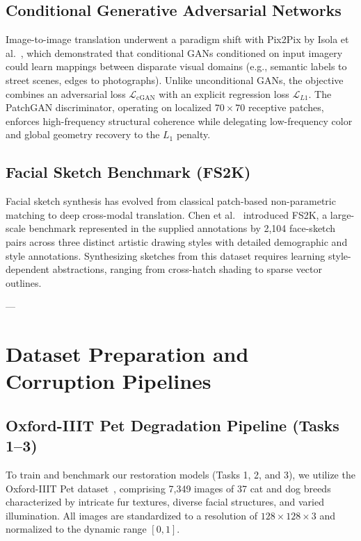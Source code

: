 \documentclass[journal,compsoc]{IEEEtran}
\begin{document}
\subsection{Conditional Generative Adversarial Networks}
Image-to-image translation underwent a paradigm shift with Pix2Pix by Isola et al.~\cite{isola2017image}, which demonstrated that conditional GANs conditioned on input imagery could learn mappings between disparate visual domains (e.g., semantic labels to street scenes, edges to photographs). Unlike unconditional GANs, the objective combines an adversarial loss $\mathcal{L}_{\text{cGAN}}$ with an explicit regression loss $\mathcal{L}_{L1}$. The PatchGAN discriminator, operating on localized $70 \times 70$ receptive patches, enforces high-frequency structural coherence while delegating low-frequency color and global geometry recovery to the $L_1$ penalty.

\subsection{Facial Sketch Benchmark (FS2K)}
Facial sketch synthesis has evolved from classical patch-based non-parametric matching to deep cross-modal translation. Chen et al.~\cite{chen2022fs2k} introduced FS2K, a large-scale benchmark represented in the supplied annotations by 2,104 face-sketch pairs across three distinct artistic drawing styles with detailed demographic and style annotations. Synthesizing sketches from this dataset requires learning style-dependent abstractions, ranging from cross-hatch shading to sparse vector outlines.

---

\section{Dataset Preparation and Corruption Pipelines}
\label{sec:dataset}

\subsection{Oxford-IIIT Pet Degradation Pipeline (Tasks 1--3)}
To train and benchmark our restoration models (Tasks 1, 2, and 3), we utilize the Oxford-IIIT Pet dataset~\cite{parkhi2012cats}, comprising 7,349 images of 37 cat and dog breeds characterized by intricate fur textures, diverse facial structures, and varied illumination. All images are standardized to a resolution of $128 \times 128 \times 3$ and normalized to the dynamic range $[0, 1]$.
\end{document}
